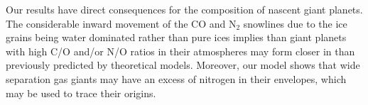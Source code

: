 \documentclass[apj]{emulateapj}
\newcommand{\emgr}[1]{\emph{ \color{gray} #1}}
\begin{document}
Our results have direct consequences for the composition of nascent giant planets. The considerable inward movement of the CO and N$_2$ snowlines due to the ice grains being water dominated rather than pure ices implies than giant planets with high C/O and/or N/O ratios in their atmospheres may form closer in than previously predicted by theoretical models. Moreover, our model shows that wide separation gas giants may have an excess of nitrogen in their envelopes, which may be used to trace their origins. %


\end{document}
